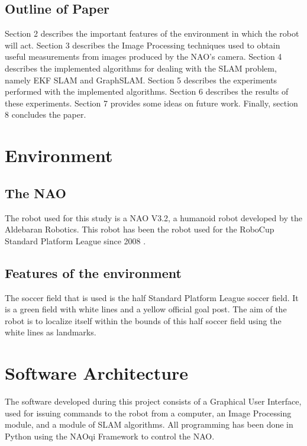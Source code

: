 \documentclass{ba-kecs}
\numberwithin{figure}{section}
\numberwithin{equation}{section}
\begin{document}
\subsection{Outline of Paper}
Section 2 describes the important features of the environment in which the robot will act. Section 3 describes the Image Processing techniques used to obtain useful measurements from images produced by the NAO's camera. Section 4 describes the implemented algorithms for dealing with the SLAM problem, namely EKF SLAM and GraphSLAM.  Section 5 describes the experiments performed with the implemented algorithms. Section 6 describes the results of these experiments. Section 7 provides some ideas on future work. Finally, section 8 concludes the paper.


\section{Environment}
\subsection{The NAO}

The robot used for this study is a NAO V3.2, a humanoid robot developed by the Aldebaran Robotics. This robot has been the robot used for the RoboCup Standard Platform League since 2008 \cite{cd2}. 


\subsection{Features of the environment}
The soccer field that is used is the half Standard Platform League soccer field. It is a green field with white lines and a yellow official goal post. The aim of the robot is to localize itself within the bounds of this half soccer field using the white lines as landmarks.


\section{Software Architecture}
The software developed during this project consists of a Graphical User Interface, used for issuing commands to the robot from a computer, an Image Processing module, and a module of SLAM algorithms. All programming has been done in Python using the NAOqi Framework to control the NAO.
\end{document}

